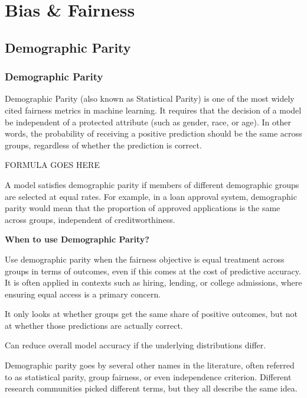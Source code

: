 \chapter{Bias \& Fairness}


\clearpage
\thispagestyle{biasfairnesstyle}
\section{Demographic Parity}
\subsection{Demographic Parity}


Demographic Parity (also known as Statistical Parity) is one of the most widely cited fairness metrics in machine learning.
It requires that the decision of a model be independent of a protected attribute (such as gender, race, or age). In other words,
the probability of receiving a positive prediction should be the same across groups, regardless of whether the prediction is correct.

\begin{center}
    FORMULA GOES HERE
\end{center}

A model satisfies demographic parity if members of different demographic groups are selected at equal rates. For example, in a loan approval
system, demographic parity would mean that the proportion of approved applications is the same across groups, independent of creditworthiness.

\textbf{When to use Demographic Parity?}

Use demographic parity when the fairness objective is equal treatment across groups in terms of outcomes, even if this comes at the cost
of predictive accuracy. It is often applied in contexts such as hiring, lending, or college admissions, where ensuring equal access is a
primary concern.

{
\item It only looks at whether groups get the same share of positive outcomes, but not at whether those predictions are actually correct.
\item Can reduce overall model accuracy if the underlying distributions differ.
}

\clearpage

\thispagestyle{customstyle}

{Demographic parity goes by several other names in the literature, often referred to as statistical parity, group fairness, or even
independence criterion. Different research communities picked different terms, but they all describe the same idea.}